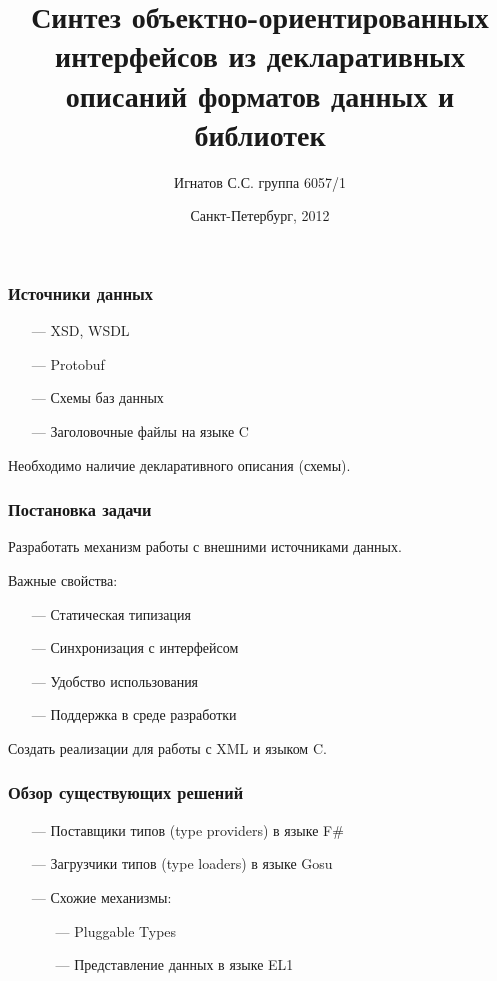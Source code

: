 \documentclass[14pt]{beamer}
\begin{document}
\title{Синтез объектно-ориентированных интерфейсов из декларативных описаний форматов данных и библиотек}
\author{Игнатов С.С. группа 6057/1}
\date{Санкт-Петербург, 2012}

\frame{\titlepage}


\begin{frame}\frametitle{Источники данных}
    \begin{itemize}
        \item[---] XSD, WSDL
        \item[---] Protobuf
        \item[---] Схемы баз данных
        \item[---] Заголовочные файлы на языке C
    \end{itemize}
    \small{Необходимо наличие декларативного описания (схемы).}
\end{frame}

\begin{frame}\frametitle{Постановка задачи}
    Разработать механизм работы с внешними источниками данных.

    Важные свойства:
    \begin{itemize}
        \item[---] Статическая типизация
        \item[---] Синхронизация с интерфейсом
        \item[---] Удобство использования
        \item[---] Поддержка в среде разработки
    \end{itemize}
    Создать реализации для работы с XML и языком C.

\end{frame}

\begin{frame}\frametitle{Обзор существующих решений} %
    \begin{itemize}
        \item[---] Поставщики типов (type providers) в языке F\#
        \item[---] Загрузчики типов (type loaders) в языке Gosu
        \item[---] Схожие механизмы:
            \begin{itemize}
                \item[---] Pluggable Types
                \item[---] Представление данных в языке EL1
            \end{itemize}
    \end{itemize}
\end{frame}
\end{document}
